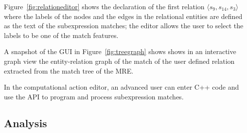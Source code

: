 Figure~\ref{fig:relationeditor} shows the declaration of the first relation 
$\langle s_9, s_{14},s_{3}\rangle$ where the 
labels of the nodes and the edges in the relational entities 
are defined as the text of the subexpression matches;
the editor allows the user to select the labels to be one of the match features. 

A snapshot of the \framework GUI in 
Figure~\ref{fig:treegraph} shows shows in an interactive graph view
the entity-relation graph of the match of the user defined relation 
extracted from the match tree of the MRE. 


In the computational action editor, an advanced user can 
enter C++ code and use the \framework API to program and process 
subexpression matches. 

\subsection{Analysis}

